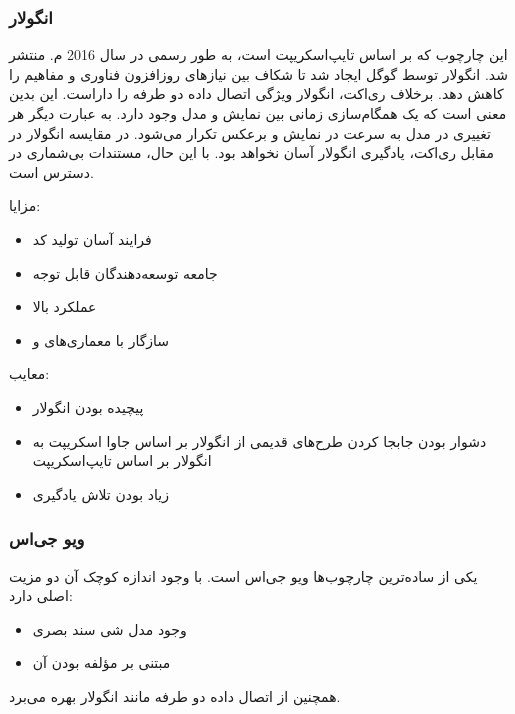 \newpage

\subsubsection{انگولار}

این چارچوب که بر اساس تایپ‌اسکریپت است، به طور رسمی در سال 2016 م. منتشر شد. انگولار توسط گوگل ایجاد شد تا شکاف بین نیازهای روزافزون فناوری و مفاهیم  را کاهش دهد. برخلاف ری‌اکت، انگولار ویژگی اتصال داده دو طرفه را داراست. این بدین معنی است که یک همگام‌سازی زمانی بین نمایش و مدل وجود دارد. به عبارت دیگر هر تغییری در مدل به سرعت در نمایش و برعکس تکرار می‌شود. در مقایسه انگولار در مقابل ری‌اکت، یادگیری انگولار آسان نخواهد بود. با این حال، مستندات بی‌شماری در دسترس است\cite{noauthor_overview_nodate}.


مزایا:
\begin{itemize}
    \item فرایند آسان تولید کد
    \item جامعه توسعه‌دهندگان قابل توجه
    \item عملکرد بالا
    \item سازگار با معماری‌های  و 
\end{itemize}


معایب:

\begin{itemize}
    \item پیچیده بودن انگولار
    \item دشوار بودن جابجا کردن طرح‌های قدیمی از انگولار بر اساس جاوا اسکریپت به انگولار بر اساس تایپ‌اسکریپت
    \item زیاد بودن تلاش یادگیری
\end{itemize}


\newpage

\subsubsection{ویو جی‌اس}

یکی از ساده‌ترین چارچوب‌ها ویو جی‌اس است. با وجود اندازه کوچک آن دو مزیت اصلی دارد:

\begin{itemize}
    \item وجود مدل شی سند بصری
    \item مبتنی بر مؤلفه بودن آن 
\end{itemize}
همچنین از اتصال داده دو طرفه مانند انگولار بهره می‌برد.


